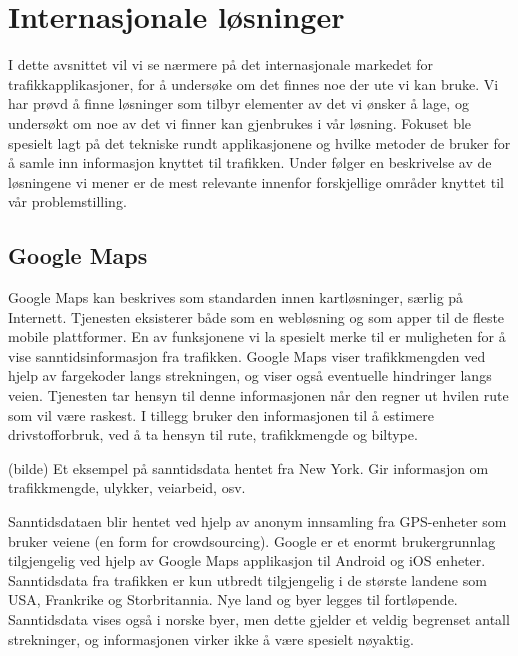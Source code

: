 \documentclass[a4paper,norsk,oneside]{book}
\begin{document}

\section{Internasjonale løsninger}
I dette avsnittet vil vi se nærmere på det internasjonale markedet for trafikkapplikasjoner, for å undersøke om det finnes noe der ute vi kan bruke. Vi har prøvd å finne løsninger som tilbyr elementer av det vi ønsker å lage, og undersøkt om noe av det vi finner kan gjenbrukes i vår løsning. Fokuset ble spesielt lagt på det tekniske rundt applikasjonene og hvilke metoder de bruker for å samle inn informasjon knyttet til trafikken. Under følger en beskrivelse av de løsningene vi mener er de mest relevante innenfor forskjellige områder knyttet til vår problemstilling.

\subsection{Google Maps}
Google Maps kan beskrives som standarden innen kartløsninger, særlig på Internett. Tjenesten eksisterer både som en webløsning og som apper til de fleste mobile plattformer. En av funksjonene vi la spesielt merke til er muligheten for å vise sanntidsinformasjon fra trafikken. Google Maps viser trafikkmengden ved hjelp av fargekoder langs strekningen, og viser også eventuelle hindringer langs veien. Tjenesten tar hensyn til denne informasjonen når den regner ut hvilen rute som vil være raskest. I tillegg bruker den informasjonen til å estimere drivstofforbruk, ved å ta hensyn til rute, trafikkmengde og biltype.

(bilde)
Et eksempel på sanntidsdata hentet fra New York.
Gir informasjon om trafikkmengde, ulykker, veiarbeid, osv.

Sanntidsdataen blir hentet ved hjelp av anonym innsamling fra GPS-enheter som bruker veiene (en form for crowdsourcing). Google er et enormt brukergrunnlag tilgjengelig ved hjelp av Google Maps applikasjon til Android og iOS enheter. Sanntidsdata fra trafikken er kun utbredt tilgjengelig i de største landene som USA, Frankrike og Storbritannia. Nye land og byer legges til fortløpende. Sanntidsdata vises også i norske byer, men dette gjelder et veldig begrenset antall strekninger, og informasjonen virker ikke å være spesielt nøyaktig.
\end{document}
